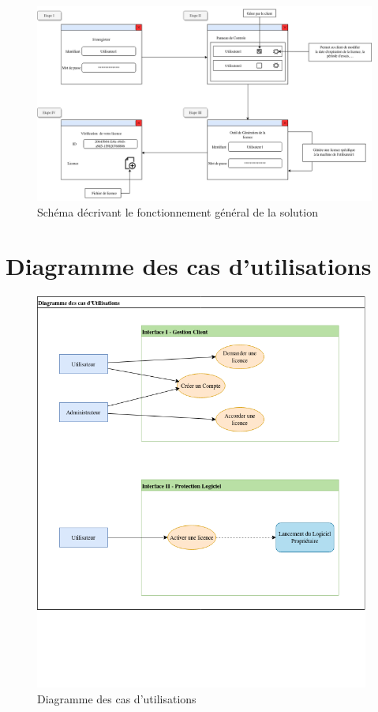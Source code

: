 \begin{figure}[hp]
	\centering
	\includegraphics[width=18cm]{main/STB.png}
	\caption{Schéma décrivant le fonctionnement général de la solution}
	\label{fig:fig1}
\end{figure}

\newpage

\section{Diagramme des cas d'utilisations}

\begin{figure}[hp]
	\centering
	\includegraphics[width=11cm]{main/Util.png}
	\caption{Diagramme des cas d'utilisations}
	\label{fig:fig2}
\end{figure}

